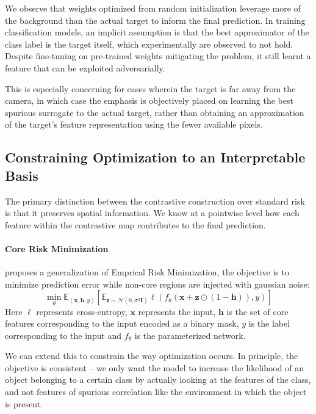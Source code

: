 \documentclass{article}
\theoremstyle{plain}
\theoremstyle{definition}
\theoremstyle{remark}
\begin{document}
We observe that weights optimized from random initialization leverage more of the background than the actual target to inform the final prediction. In training classification models, an implicit assumption is that the best approximator of the class label is the target itself, which experimentally are observed to not hold. Despite fine-tuning on pre-trained weights mitigating the problem, it still learnt a feature that can be exploited adversarially.

This is especially concerning for cases wherein the target is far away from the camera, in which case the emphasis is objectively placed on learning the best spurious surrogate to the actual target, rather than obtaining an approximation of the target's feature representation using the fewer available pixels.


\subsection{Constraining Optimization to an Interpretable Basis}
\label{sec:constraining-optimization}

The primary distinction between the contrastive construction over standard risk is that it preserves spatial information. We know at a pointwise level how each feature within the contrastive map contributes to the final prediction.

\paragraph{Core Risk Minimization \citep{singla2022core}} proposes a generalization of Emprical Risk Minimization, the objective is to minimize prediction error while non-core regions are injected with gaussian noise:
\begin{equation}
	\min_\theta \mathbb{E}_{(\bm{x}, \bm{h}, y)} [ \mathbb{E}_{\bm{z} \sim \mathcal{N}(0, \sigma^2 \bm{I})} \ell(f_\theta(\bm{x} + \bm{z} \odot (1 - \bm{h})), y) ]
\end{equation}
Here $\ell$ represents cross-entropy, $\bm{x}$ represents the input, $\bm{h}$ is the set of core features corresponding to the input encoded as a binary mask, $y$ is the label corresponding to the input and $f_\theta$ is the parameterized network.

We can extend this to constrain the way optimization occurs. In principle, the objective is consistent -- we only want the model to increase the likelihood of an object belonging to a certain class by actually looking at the features of the class, and not features of spurious correlation like the environment in which the object is present.
\end{document}
